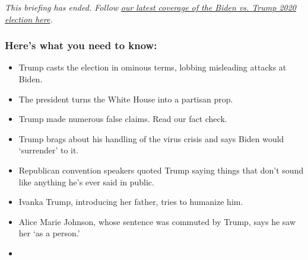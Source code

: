 \emph{This briefing has ended. Follow}
\href{https://www.nytimes3xbfgragh.onion/live/2020/08/28/us/trump-vs-biden}{\emph{our
latest coverage of the Biden vs. Trump 2020 election here}}\emph{.}

\hypertarget{heres-what-you-need-to-know}{%
\subsubsection{Here's what you need to
know:}\label{heres-what-you-need-to-know}}

\begin{itemize}
\item
  \protect\hyperlink{trump-casts-the-election-in-ominous-terms-lobbing-misleading-attacks-at-biden}{}

  Trump casts the election in ominous terms, lobbing misleading attacks
  at Biden.
\item
  \protect\hyperlink{the-president-turns-the-white-house-into-a-partisan-prop}{}

  The president turns the White House into a partisan prop.
\item
  \protect\hyperlink{trump-made-numerous-false-claims-read-our-fact-check}{}

  Trump made numerous false claims. Read our fact check.
\item
  \protect\hyperlink{trump-brags-about-his-handling-of-the-virus-crisis-and-says-biden-would-surrender-to-it}{}

  Trump brags about his handling of the virus crisis and says Biden
  would `surrender' to it.
\item
  \protect\hyperlink{republican-convention-speakers-quoted-trump-saying-things-that-dont-sound-like-anything-hes-ever-said-in-public}{}

  Republican convention speakers quoted Trump saying things that don't
  sound like anything he's ever said in public.
\item
  \protect\hyperlink{ivanka-trump-introducing-her-father-tries-to-humanize-him}{}

  Ivanka Trump, introducing her father, tries to humanize him.
\item
  \protect\hyperlink{alice-marie-johnson-whose-sentence-was-commuted-by-trump-says-he-saw-her-as-a-person}{}

  Alice Marie Johnson, whose sentence was commuted by Trump, says he saw
  her `as a person.'
\item
  \protect\hyperlink{protesters-gather-in-dc-shortly-before-trumps-speech-to-denounce-the-shooting-of-jacob-blake}{}


\end{itemize}
